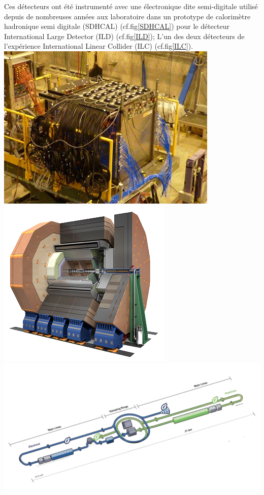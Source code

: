 Ces détecteurs ont été instrumenté avec une électronique dite semi-digitale utilisé depuis de nombreuses années aux laboratoire dans un prototype de calorimètre hadronique semi digitale (SDHCAL) (cf.fig\ref{SDHCAL}) \cite{Buridon:2016ill} pour le détecteur International Large Detector (ILD) (cf.fig\ref{ILD}); L'un des deux détecteurs de l'expérience International Linear Collider (ILC) (cf.fig\ref{ILC}).
\marginpar
{
	\centering
	\includegraphics[width=\marginparwidth]{GLA/SDHCAL.jpg}
	\label{SDHCAL}
}
\marginpar
{
	\centering
	\includegraphics[width=\marginparwidth]{GLA/ILD.png}
	\label{ILD}
}
\marginpar
{
	\centering
	\includegraphics[width=\marginparwidth]{GLA/ILC.png}
	\label{ILC}
}

